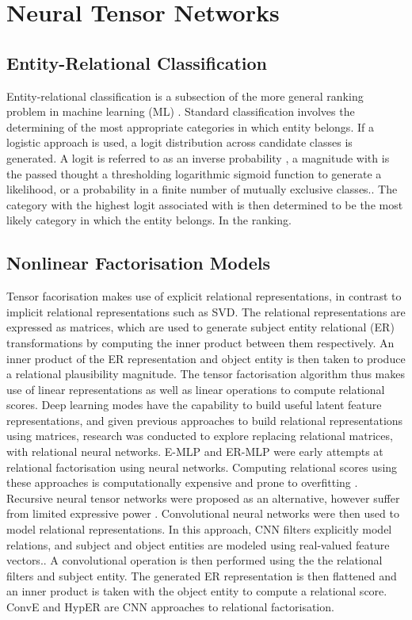 
\section{Neural Tensor Networks}

\subsection{Entity-Relational Classification}
Entity-relational classification is a subsection of the more general ranking problem in machine learning (ML) \citet{ranking, ranking ranking}. Standard classification involves the determining of the most appropriate categories in which entity belongs. If a logistic approach is used, a logit distribution across candidate classes is generated. A logit is referred to as an inverse probability \citet{wikipedia}, a magnitude with is the passed thought a thresholding logarithmic sigmoid function to generate a likelihood, or a probability in a finite number of mutually exclusive classes.. The category with the highest logit associated with is then determined to be the most likely category in which the entity belongs. In the ranking. 

\subsection{Nonlinear Factorisation Models}
Tensor facorisation makes use of explicit relational representations, in contrast to implicit relational representations such as SVD. The relational representations are expressed as matrices, which are used to generate subject entity relational (ER) transformations by computing the inner product between them respectively. An inner product of the ER representation and object entity is then taken to produce a relational plausibility magnitude. The tensor factorisation algorithm thus makes use of linear representations as well as linear operations to compute relational scores. 
Deep learning modes have the capability to build useful latent feature representations, and given previous approaches to build relational representations using matrices, research was conducted to explore replacing relational matrices, with relational neural networks. E-MLP and ER-MLP were early attempts at relational factorisation using neural networks. Computing relational scores using these approaches is computationally expensive and prone to overfitting \cite{reference}. Recursive neural tensor networks were proposed as an alternative, however suffer from limited expressive power \cite{reference}.
Convolutional neural networks were then used to model relational representations. In this approach, CNN filters explicitly model relations, and subject and object entities are modeled using real-valued feature vectors.. A convolutional operation is then performed using the the relational filters and subject entity. The generated ER representation is then flattened and an inner product is taken with the object entity to compute a relational score. ConvE and HypER are CNN approaches to relational factorisation. 

